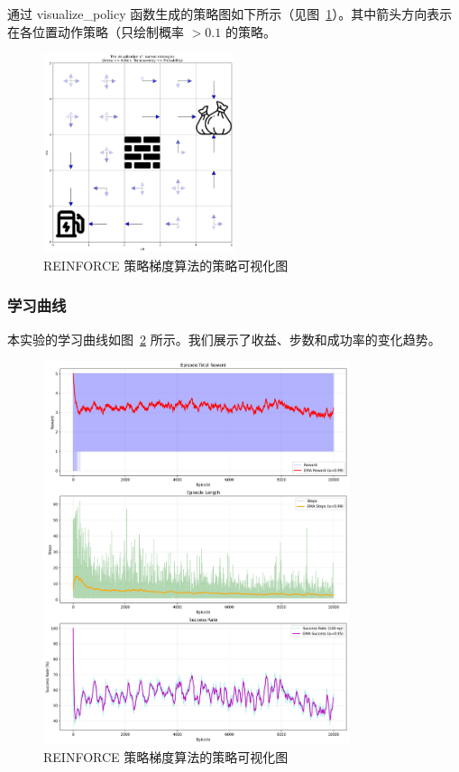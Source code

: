 通过 \textsf{visualize\_policy} 函数生成的策略图如下所示（见图~\ref{fig:REINFORCE_policy}）。其中箭头方向表示在各位置动作策略（只绘制概率 \(> 0.1\) 的策略。

\begin{figure}[htbp] 
    \centering 
    \includegraphics[width=0.5\textwidth]{figure/sweep_robot/REINFORCE/policy_visualization.png} 
    \caption{REINFORCE 策略梯度算法的策略可视化图}\label{fig:REINFORCE_policy} 
\end{figure}

\subsubsection{学习曲线}

本实验的学习曲线如图~\ref{fig:REINFORCE_training} 所示。我们展示了收益、步数和成功率的变化趋势。

\begin{figure}[htbp] 
    \centering 
    \includegraphics[width=0.8\textwidth]{figure/sweep_robot/REINFORCE/training_results.png} 
    \caption{REINFORCE 策略梯度算法的策略可视化图}\label{fig:REINFORCE_training} 
\end{figure}

